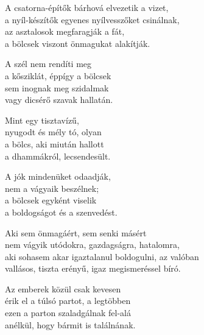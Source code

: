 \begin{dhpverse}

 A csatorna-építők bárhová elvezetik a vizet,\\
a nyíl-készítők egyenes nyílvesszőket csinálnak,\\
az asztalosok megfaragják a fát,\\
a bölcsek viszont önmagukat alakítják.

 A szél nem rendíti meg\\
a kősziklát, éppígy a bölcsek\\
sem inognak meg szidalmak\\
vagy dicsérő szavak hallatán.

 Mint egy tisztavízű,\\
nyugodt és mély tó, olyan\\
a bölcs, aki miután hallott\\
a dhammákról, lecsendesült.

 A jók mindenüket odaadják,\\
nem a vágyaik beszélnek;\\
a bölcsek egyként viselik\\
a boldogságot és a szenvedést.

 Aki sem önmagáért, sem senki másért\\
nem vágyik utódokra, gazdagságra, hatalomra,\\
aki sohasem akar igaztalanul boldogulni, az valóban\\
vallásos, tiszta erényű, igaz megismeréssel bíró.

 Az emberek közül csak kevesen\\
érik el a túlsó partot, a legtöbben\\
ezen a parton szaladgálnak fel-alá\\
anélkül, hogy bármit is találnának.

\end{dhpverse}
\newpage
